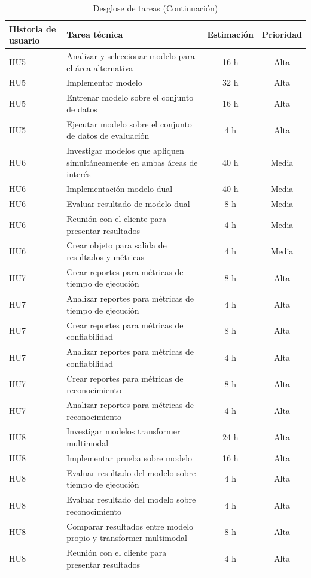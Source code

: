 \documentclass[
11pt, %
]{charter}
\begin{document}
\begin{table}[H]
\caption{Desglose de tareas (Continuación)}
\centering
\begin{tabularx}{\linewidth}{@{}|l|X|c|c|@{}}
\hline
\rowcolor[HTML]{C0C0C0}
Historia de usuario & Tarea técnica & Estimación & Prioridad \\ \hline

HU5 & Analizar y seleccionar modelo para el área alternativa & 16 h & Alta \\ \hline
HU5 & Implementar modelo & 32 h & Alta \\ \hline
HU5 & Entrenar modelo sobre el conjunto de datos & 16 h & Alta \\ \hline
HU5 & Ejecutar modelo sobre el conjunto de datos de evaluación & 4 h & Alta \\ \hline

HU6 & Investigar modelos que apliquen simultáneamente en ambas áreas de interés & 40 h & Media \\ \hline
HU6 & Implementación modelo dual & 40 h & Media \\ \hline
HU6 & Evaluar resultado de modelo dual & 8 h & Media \\ \hline
HU6 & Reunión con el cliente para presentar resultados & 4 h & Media \\ \hline
HU6 & Crear objeto para salida de resultados y métricas & 4 h & Media \\ \hline

HU7 & Crear reportes para métricas de tiempo de ejecución & 8 h & Alta \\ \hline
HU7 & Analizar reportes para métricas de tiempo de ejecución & 4 h & Alta \\ \hline
HU7 & Crear reportes para métricas de confiabilidad & 8 h & Alta \\ \hline
HU7 & Analizar reportes para métricas de confiabilidad & 4 h & Alta \\ \hline
HU7 & Crear reportes para métricas de reconocimiento & 8 h & Alta \\ \hline
HU7 & Analizar reportes para métricas de reconocimiento & 4 h & Alta \\ \hline

HU8 & Investigar modelos transformer multimodal & 24 h & Alta \\ \hline
HU8 & Implementar prueba sobre modelo & 16 h & Alta \\ \hline
HU8 & Evaluar resultado del modelo sobre tiempo de ejecución & 4 h & Alta \\ \hline
HU8 & Evaluar resultado del modelo sobre reconocimiento & 4 h & Alta \\ \hline
HU8 & Comparar resultados entre modelo propio y transformer multimodal & 8 h & Alta \\ \hline
HU8 & Reunión con el cliente para presentar resultados & 4 h & Alta \\ \hline

\end{tabularx}
\end{table}
\end{document}
